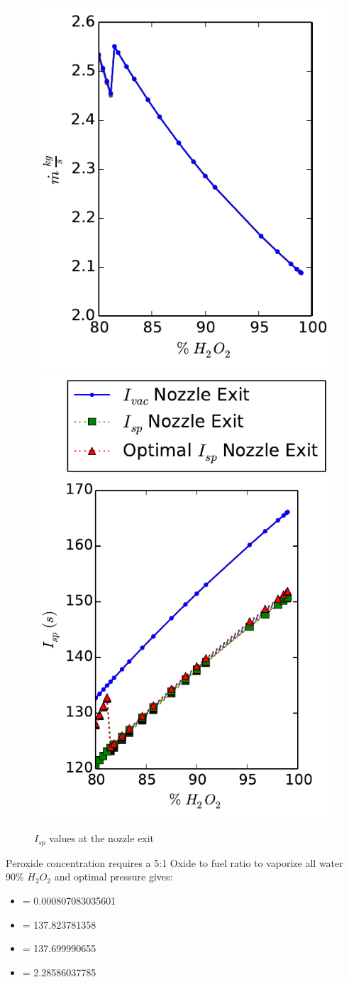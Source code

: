 \documentclass[cleanfoot,cleanhead,onecolumn,12pt,notitlepage]{asme2e}
\begin{document}
\begin{figure}[h!]
    \begin{center}
        \includegraphics[width=0.45\linewidth]{../Plot_CEA/Part1/Part1_vi.pdf}
        \includegraphics[width=0.45\linewidth]{../Plot_CEA/Part1/Part1_v.pdf}
        \caption{$I_{sp}$ values at the nozzle exit}
        \label{fig:1-iv}
    \end{center}
\end{figure}

Peroxide concentration requires a 5:1 Oxide to fuel ratio to vaporize all water
90\% $H_2O_2$ and optimal pressure gives:
\begin{itemize}
    \item {}         = 0.000807083035601
    \item {}        = 137.823781358
    \item {}   = 137.699990655
    \item {}       = 2.28586037785
\end{itemize}
\end{document}
